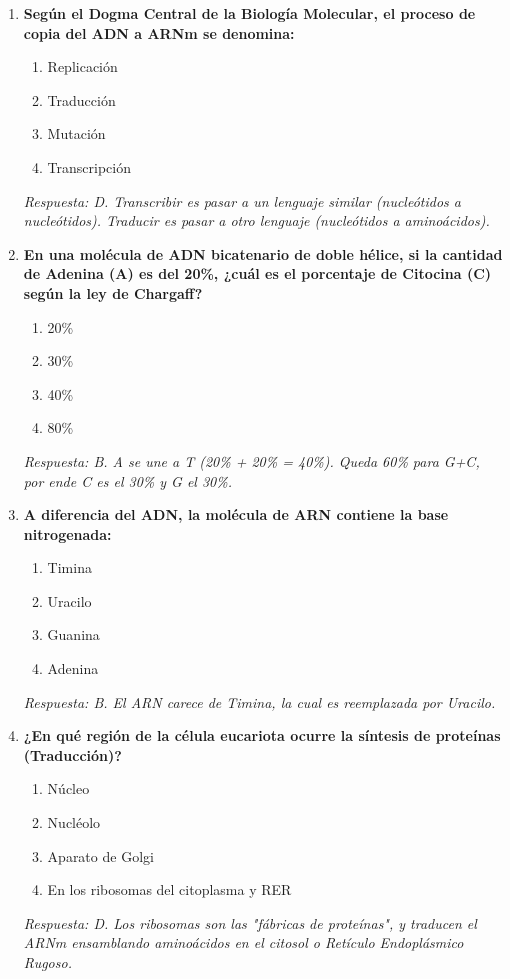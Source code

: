 \documentclass[spanish,letterpaper,oneside]{article}
\begin{document}
\begin{enumerate}[label=\textbf{\arabic*.}]
    \item \textbf{Según el Dogma Central de la Biología Molecular, el proceso de copia del ADN a ARNm se denomina:}
    \begin{enumerate}
        \item[A)] Replicación
        \item[B)] Traducción
        \item[C)] Mutación
        \item[D)] Transcripción
    \end{enumerate}
    \textit{Respuesta: D. Transcribir es pasar a un lenguaje similar (nucleótidos a nucleótidos). Traducir es pasar a otro lenguaje (nucleótidos a aminoácidos).}

    \item \textbf{En una molécula de ADN bicatenario de doble hélice, si la cantidad de Adenina (A) es del 20\%, ¿cuál es el porcentaje de Citocina (C) según la ley de Chargaff?}
    \begin{enumerate}
        \item[A)] 20\%
        \item[B)] 30\%
        \item[C)] 40\%
        \item[D)] 80\%
    \end{enumerate}
    \textit{Respuesta: B. A se une a T (20\% + 20\% = 40\%). Queda 60\% para G+C, por ende C es el 30\% y G el 30\%.}

    \item \textbf{A diferencia del ADN, la molécula de ARN contiene la base nitrogenada:}
    \begin{enumerate}
        \item[A)] Timina
        \item[B)] Uracilo
        \item[C)] Guanina
        \item[D)] Adenina
    \end{enumerate}
    \textit{Respuesta: B. El ARN carece de Timina, la cual es reemplazada por Uracilo.}

    \item \textbf{¿En qué región de la célula eucariota ocurre la síntesis de proteínas (Traducción)?}
    \begin{enumerate}
        \item[A)] Núcleo
        \item[B)] Nucléolo
        \item[C)] Aparato de Golgi
        \item[D)] En los ribosomas del citoplasma y RER
    \end{enumerate}
    \textit{Respuesta: D. Los ribosomas son las "fábricas de proteínas", y traducen el ARNm ensamblando aminoácidos en el citosol o Retículo Endoplásmico Rugoso.}


\end{enumerate}
\end{document}
